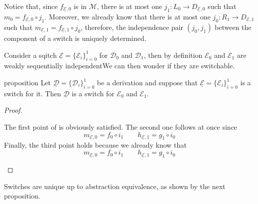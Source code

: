 \documentclass[a4paper,UKenglish,cleveref,pdftex, thm-restate,numberwithinsect]{lipics}
\newcommand{\dder}[1]{\mathscr{#1}}
\newcommand{\der}[1]{\underline{\dder{#1}}}
\begin{document}
\begin{remark}\label{rem:fact}
	Notice that, since $f_{\der{E}, 0}$ is in $\mathcal{M}$, there is at most one $j_1\colon L_0\to D_{\der{E},0}$ such that $m_0=f_{\der{E}, 0} \circ j_1$. Moreover, we already know that there is at most one $j_0\colon R_1\to D_{\der{E},1}$ such that $m_{\der{E},1}=f_{\der{E},1}\circ j_0$, therefore, the independence pair $(j_0,j_1)$ between the component of a switch is uniquely determined.
\end{remark}


Consider a sqitch $\der{E}=\{\dder{E}_i\}_{i=0}^1$ for $\dder{D}_0$ and $\dder{D}_1$, then by definition $\dder{E}_0$ and $\dder{E}_1$ are weakly sequentially independentWe can then wonder if they are switchable.

\begin{theoremEnd}[category=sec3]{proposition}
	Let $\der{D}=\{\dder{D}_i\}_{i=0}^1$ be a derivation and suppose that $\der{E}=\{\dder{E}_i\}_{i=0}^1$ is a switch for it. Then $\der{D}$ is a switch for $\dder{E_0}$ and $\dder{E}_1$.
\end{theoremEnd}
\begin{proof}\begin{proofEnd}
	The first point of  is obviously satisfied. The second one follows at once since 
	\[m_{\der{E},0}= f_0\circ i_1 \qquad h_{\der{E},1}= g_{1}\circ i_0\]
	Finally, the third point holds because we already know that 
\[m_{\der{E},0}= f_0\circ i_1 \qquad h_{\der{E},1}= g_{1}\circ i_0\]
	\end{proofEnd}
\end{proof}

Switches are unique up to abstraction equivalence, as shown by the next proposition.
\end{document}
